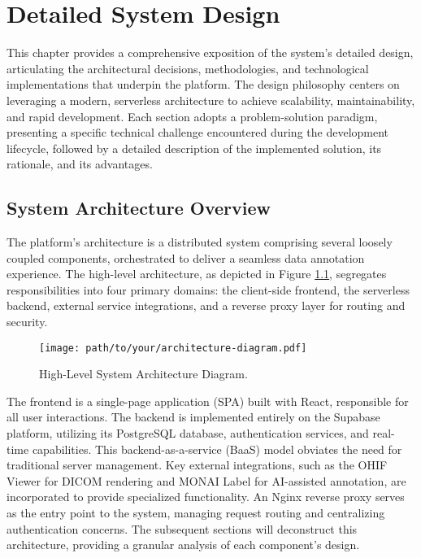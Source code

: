\chapter{Detailed System Design}
\label{chap:system_design}

This chapter provides a comprehensive exposition of the system's detailed design, articulating the architectural decisions, methodologies, and technological implementations that underpin the platform. The design philosophy centers on leveraging a modern, serverless architecture to achieve scalability, maintainability, and rapid development. Each section adopts a problem-solution paradigm, presenting a specific technical challenge encountered during the development lifecycle, followed by a detailed description of the implemented solution, its rationale, and its advantages.

\section{System Architecture Overview}
\label{sec:system_architecture_overview}

The platform's architecture is a distributed system comprising several loosely coupled components, orchestrated to deliver a seamless data annotation experience. The high-level architecture, as depicted in Figure \ref{fig:system_architecture}, segregates responsibilities into four primary domains: the client-side frontend, the serverless backend, external service integrations, and a reverse proxy layer for routing and security.

\begin{figure}[h]
    \centering
    \texttt{[image: path/to/your/architecture-diagram.pdf]}
    \caption{High-Level System Architecture Diagram.}
    \label{fig:system_architecture}
\end{figure}

The frontend is a single-page application (SPA) built with React, responsible for all user interactions. The backend is implemented entirely on the Supabase platform, utilizing its PostgreSQL database, authentication services, and real-time capabilities. This backend-as-a-service (BaaS) model obviates the need for traditional server management. Key external integrations, such as the OHIF Viewer for DICOM rendering and MONAI Label for AI-assisted annotation, are incorporated to provide specialized functionality. An Nginx reverse proxy serves as the entry point to the system, managing request routing and centralizing authentication concerns. The subsequent sections will deconstruct this architecture, providing a granular analysis of each component's design.

